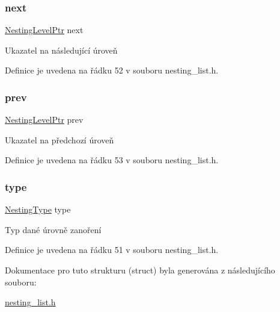 \subsubsection{\texorpdfstring{next}{next}}
{\footnotesize\ttfamily \hyperlink{nesting__list_8h_aea99292989d40bb6f97ba07eb2c820a6}{Nesting\+Level\+Ptr} next}



Ukazatel na následující úroveň 



Definice je uvedena na řádku 52 v souboru nesting\+\_\+list.\+h.

\mbox{\label{struct_s___nesting_level_af0df77c87e9f5aff1047f2cd48964884}} 
\subsubsection{\texorpdfstring{prev}{prev}}
{\footnotesize\ttfamily \hyperlink{nesting__list_8h_aea99292989d40bb6f97ba07eb2c820a6}{Nesting\+Level\+Ptr} prev}



Ukazatel na předchozí úroveň 



Definice je uvedena na řádku 53 v souboru nesting\+\_\+list.\+h.

\mbox{\label{struct_s___nesting_level_a112376f51f31d62569b34388e7303384}} 
\subsubsection{\texorpdfstring{type}{type}}
{\footnotesize\ttfamily \hyperlink{nesting__list_8h_ae3be7fd101359a3813b67cf856c7c2d8}{Nesting\+Type} type}



Typ dané úrovně zanoření 



Definice je uvedena na řádku 51 v souboru nesting\+\_\+list.\+h.



Dokumentace pro tuto strukturu (struct) byla generována z následujícího souboru\+:\begin{DoxyCompactItemize}
\item 
\hyperlink{nesting__list_8h}{nesting\+\_\+list.\+h}\end{DoxyCompactItemize}
